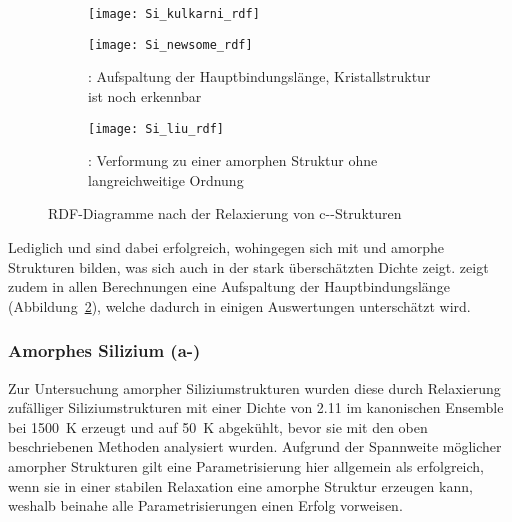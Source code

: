 \begin{figure}[p]
  \centering

  \captionsetup[subfigure]{singlelinecheck=false}
  \def\subfigwidth{\textwidth}
  \begin{subfigure}[t]{\subfigwidth}
    \texttt{[image: Si\_kulkarni\_rdf]}
    \label{fig:kulkarnirdf}
  \end{subfigure}

  \vspace{1em}

  \begin{subfigure}[t]{\subfigwidth}
    \texttt{[image: Si\_newsome\_rdf]}
    \caption{: Aufspaltung der Hauptbindungslänge, Kristallstruktur ist noch erkennbar}
    \label{fig:newsomerdf}
  \end{subfigure}

  \vspace{1em}

  \begin{subfigure}[t]{\subfigwidth}
    \texttt{[image: Si\_liu\_rdf]}
    \caption{: Verformung zu einer amorphen Struktur ohne langreichweitige Ordnung}
    \label{fig:liurdf}
  \end{subfigure}

  \caption{RDF-Diagramme nach der Relaxierung von c--Strukturen}
  \label{fig:siliconrdf}
\end{figure}

Lediglich  und  sind dabei erfolgreich, wohingegen sich mit  und  amorphe Strukturen bilden, was sich auch in der stark überschätzten Dichte zeigt.
 zeigt zudem in allen Berechnungen eine Aufspaltung der Hauptbindungslänge (Abbildung~\ref{fig:newsomerdf}), welche dadurch in einigen Auswertungen unterschätzt wird.

\subsubsection{Amorphes Silizium (a-)}

Zur Untersuchung amorpher Siliziumstrukturen wurden diese durch Relaxierung zufälliger Siliziumstrukturen mit einer Dichte von \SI{2.11}{\gpcc} im kanonischen Ensemble bei \SI{1500}{\kelvin} erzeugt und auf \SI{50}{\kelvin} abgekühlt, bevor sie mit den oben beschriebenen Methoden analysiert wurden.
Aufgrund der Spannweite möglicher amorpher Strukturen gilt eine Parametrisierung hier allgemein als erfolgreich, wenn sie in einer stabilen Relaxation eine amorphe Struktur erzeugen kann, weshalb beinahe alle Parametrisierungen einen Erfolg vorweisen.


